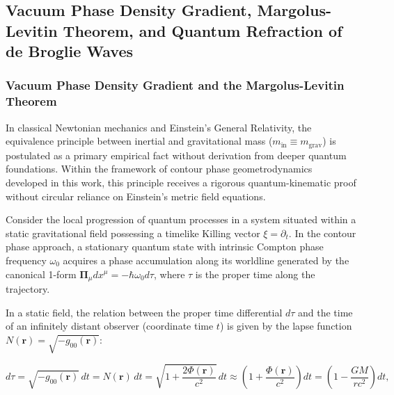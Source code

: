 
\subsection{Vacuum Phase Density Gradient, Margolus-Levitin Theorem, and Quantum Refraction of de Broglie Waves}\label{sec:2.4}

\subsubsection{Vacuum Phase Density Gradient and the Margolus-Levitin Theorem \cite{ref16}}\label{sec:2.4.1}

In classical Newtonian mechanics and Einstein's General Relativity, the equivalence principle between inertial and gravitational mass ($m_{\text{in}} \equiv m_{\text{grav}}$) is postulated as a primary empirical fact without derivation from deeper quantum foundations. Within the framework of contour phase geometrodynamics developed in this work, this principle receives a rigorous quantum-kinematic proof without circular reliance on Einstein's metric field equations.

Consider the local progression of quantum processes in a system situated within a static gravitational field possessing a timelike Killing vector $\xi = \partial_t$. In the contour phase approach, a stationary quantum state with intrinsic Compton phase frequency $\omega_0$ acquires a phase accumulation along its worldline generated by the canonical 1-form $\mathbf{\Pi}_\mu dx^\mu = -\hbar \omega_0 d\tau$, where $\tau$ is the proper time along the trajectory.

In a static field, the relation between the proper time differential $d\tau$ and the time of an infinitely distant observer (coordinate time $t$) is given by the lapse function $N(\mathbf{r}) = \sqrt{-g_{00}(\mathbf{r})}$:

\begin{equation}\label{eq:2.26}\label{eq:2.76}\tag{2.26}
d\tau = \sqrt{-g_{00}(\mathbf{r})} \, dt = N(\mathbf{r}) \, dt = \sqrt{1 + \frac{2\Phi(\mathbf{r})}{c^2}} \, dt \approx \left( 1 + \frac{\Phi(\mathbf{r})}{c^2} \right) dt = \left( 1 - \frac{GM}{r c^2} \right) dt,
\end{equation}

